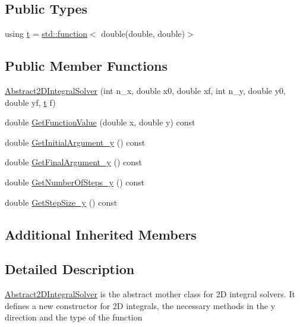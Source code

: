 \subsection*{Public Types}
\begin{DoxyCompactItemize}
\item 
using \hyperlink{class_abstract2_d_integral_solver_ab660df32953c6b0f9f3a45a8720eaeb3}{t} = \hyperlink{_tests_8cpp_a1c2dbde1ba7d93e381d4ccb9f603be16}{std\+::function}$<$ double(double, double)$>$
\end{DoxyCompactItemize}
\subsection*{Public Member Functions}
\begin{DoxyCompactItemize}
\item 
\hyperlink{class_abstract2_d_integral_solver_ad25b34f07befbbad7d3ec2b76d47b2b7}{Abstract2\+D\+Integral\+Solver} (int n\+\_\+x, double x0, double xf, int n\+\_\+y, double y0, double yf, \hyperlink{class_abstract2_d_integral_solver_ab660df32953c6b0f9f3a45a8720eaeb3}{t} f)
\item 
double \hyperlink{class_abstract2_d_integral_solver_a925351cc0ac65900e7ff42fd9d7e6973}{Get\+Function\+Value} (double x, double y) const
\item 
double \hyperlink{class_abstract2_d_integral_solver_a337907e938e5aa286618fd582b7b304e}{Get\+Initial\+Argument\+\_\+y} () const
\item 
double \hyperlink{class_abstract2_d_integral_solver_ab4a24610598fa26556c60c449d757b65}{Get\+Final\+Argument\+\_\+y} () const
\item 
double \hyperlink{class_abstract2_d_integral_solver_ad82316695f57ad589714598617c7784d}{Get\+Number\+Of\+Steps\+\_\+y} () const
\item 
double \hyperlink{class_abstract2_d_integral_solver_a5c23a838a4db9b607140d4d5f03b4f79}{Get\+Step\+Size\+\_\+y} () const
\end{DoxyCompactItemize}
\subsection*{Additional Inherited Members}


\subsection{Detailed Description}
\hyperlink{class_abstract2_d_integral_solver}{Abstract2\+D\+Integral\+Solver} is the abstract mother class for 2D integral solvers. It defines a new constructor for 2D integrals, the necessary methods in the y direction and the type of the function 

